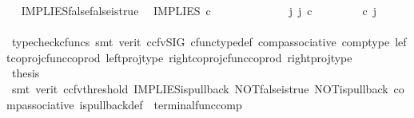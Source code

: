 \begin{isabellebody}
\isamarkupfalse%
%
\endisatagproof
{\isafoldproof}%
%
\isadelimproof
\ \isanewline
%
\endisadelimproof
\isanewline
{}\isamarkupfalse%
\ IMPLIES{\isacharunderscore}{\kern0pt}false{\isacharunderscore}{\kern0pt}false{\isacharunderscore}{\kern0pt}is{\isacharunderscore}{\kern0pt}true{\isacharcolon}{\kern0pt}\isanewline
\ \ {\isachardoublequoteopen}IMPLIES\ {\isasymcirc}\isactrlsub c\ \ {\isasymlangle}{\isasymf}{\isacharcomma}{\kern0pt}{\isasymf}{\isasymrangle}\ {\isacharequal}{\kern0pt}\ {\isasymt}{\isachardoublequoteclose}\isanewline
%
\isadelimproof
%
\endisadelimproof
%
\isatagproof
{}\isamarkupfalse%
\ {\isacharminus}{\kern0pt}\ \ \ \isanewline
\ \ \isamarkupfalse%
\ {\isachardoublequoteopen}{\isasymexists}\ j{\isachardot}{\kern0pt}\ j\ {\isasymin}\isactrlsub c\ {\isasymone}{\isasymCoprod}{\isacharparenleft}{\kern0pt}{\isasymone}{\isasymCoprod}{\isasymone}{\isacharparenright}{\kern0pt}\ {\isasymand}\ {\isacharparenleft}{\kern0pt}{\isasymlangle}{\isasymt}{\isacharcomma}{\kern0pt}\ {\isasymt}{\isasymrangle}{\isasymamalg}\ {\isacharparenleft}{\kern0pt}{\isasymlangle}{\isasymf}{\isacharcomma}{\kern0pt}\ {\isasymf}{\isasymrangle}\ {\isasymamalg}{\isasymlangle}{\isasymf}{\isacharcomma}{\kern0pt}\ {\isasymt}{\isasymrangle}{\isacharparenright}{\kern0pt}{\isacharparenright}{\kern0pt}\ {\isasymcirc}\isactrlsub c\ j\ \ {\isacharequal}{\kern0pt}\ {\isasymlangle}{\isasymf}{\isacharcomma}{\kern0pt}{\isasymf}{\isasymrangle}{\isachardoublequoteclose}\isanewline
\ \ \ \ \isamarkupfalse%
\ {\isacharparenleft}{\kern0pt}typecheck{\isacharunderscore}{\kern0pt}cfuncs{\isacharcomma}{\kern0pt}\ smt\ {\isacharparenleft}{\kern0pt}verit{\isacharcomma}{\kern0pt}\ ccfv{\isacharunderscore}{\kern0pt}SIG{\isacharparenright}{\kern0pt}\ cfunc{\isacharunderscore}{\kern0pt}type{\isacharunderscore}{\kern0pt}def\ comp{\isacharunderscore}{\kern0pt}associative\ comp{\isacharunderscore}{\kern0pt}type\ left{\isacharunderscore}{\kern0pt}coproj{\isacharunderscore}{\kern0pt}cfunc{\isacharunderscore}{\kern0pt}coprod\ left{\isacharunderscore}{\kern0pt}proj{\isacharunderscore}{\kern0pt}type\ right{\isacharunderscore}{\kern0pt}coproj{\isacharunderscore}{\kern0pt}cfunc{\isacharunderscore}{\kern0pt}coprod\ right{\isacharunderscore}{\kern0pt}proj{\isacharunderscore}{\kern0pt}type{\isacharparenright}{\kern0pt}\isanewline
\ \ \isamarkupfalse%
\ \isamarkupfalse%
\ {\isacharquery}{\kern0pt}thesis\isanewline
\ \ \ \ \isamarkupfalse%
\ {\isacharparenleft}{\kern0pt}smt\ {\isacharparenleft}{\kern0pt}verit{\isacharcomma}{\kern0pt}\ ccfv{\isacharunderscore}{\kern0pt}threshold{\isacharparenright}{\kern0pt}\ IMPLIES{\isacharunderscore}{\kern0pt}is{\isacharunderscore}{\kern0pt}pullback\ NOT{\isacharunderscore}{\kern0pt}false{\isacharunderscore}{\kern0pt}is{\isacharunderscore}{\kern0pt}true\ NOT{\isacharunderscore}{\kern0pt}is{\isacharunderscore}{\kern0pt}pullback\ comp{\isacharunderscore}{\kern0pt}associative{}\ is{\isacharunderscore}{\kern0pt}pullback{\isacharunderscore}{\kern0pt}def\ \ terminal{\isacharunderscore}{\kern0pt}func{\isacharunderscore}{\kern0pt}comp{\isacharparenright}{\kern0pt}\isanewline

\end{isabellebody}
